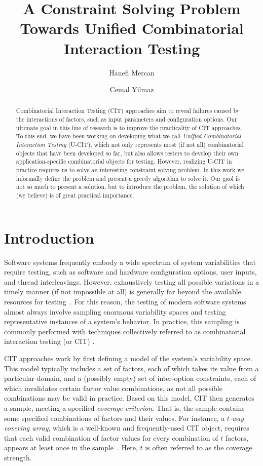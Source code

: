 \documentclass[EPiCempty]{easychair}
\title{A Constraint Solving Problem Towards Unified Combinatorial Interaction Testing}
\author{ Hanefi Mercan \and Cemal Yilmaz }
\institute{
  Faculty of Engineering and Natural Sciences,\\
  Sabanci University, Istanbul, Turkey\\
  \email{\{hanefimercan,cyilmaz\}@sabanciuniv.edu}
 }
\begin{document}
\maketitle

\begin{abstract}
Combinatorial Interaction Testing (CIT) approaches aim to reveal failures caused by the interactions of factors, such as input parameters and configuration options. Our ultimate goal in this line of research is to improve the practicality of CIT approaches. To this end, we have been working on developing what we call {\em Unified Combinatorial Interaction Testing} (U-CIT), which not only represents most (if not all) combinatorial objects that have been developed so far, but also allows testers to develop their own application-specific combinatorial objects for testing. However, realizing U-CIT in practice requires us to solve an interesting constraint solving problem. In this work we informally define the problem and present a greedy algorithm to solve it. Our gaol is not so much to present a solution, but to introduce the problem, the solution of which (we believe) is of great practical importance.
\end{abstract}

\section{Introduction}
\label{intro}

Software systems frequently embody a wide spectrum of system variabilities that require testing, such as software and hardware configuration options, user inputs, and thread interleavings. However, exhaustively testing all possible variations in a timely manner (if not impossible at all) is generally far beyond the available resources for testing~\cite{yilmaz2014moving}. For this reason, the testing of modern software systems almost always involve sampling enormous variability spaces and testing representative instances of a system's behavior. In practice, this sampling is commonly performed with techniques collectively referred to as combinatorial interaction testing (or CIT) \cite{yilmaz2014moving,nie2011survey}. 

CIT approaches work by first defining a model of the system's
variability space. This model typically includes a set of factors, each of which takes its value from a particular domain, and a (possibly empty) set of inter-option constraints, each of which invalidates certain factor value combinations, as not all possible combinations may be valid in practice. Based on this model, CIT then generates a sample, meeting a specified \emph{coverage criterion}. That is, the sample contains some specified combinations of factors and their values. For instance, a {\em $t$-way covering array}, which is a well-known and frequently-used CIT object, requires that each valid combination of factor values for every combination of $t$ factors, appears at least once in the sample~\cite{cohen1997aetg}. Here, $t$ is often referred to as the coverage strength. 
\end{document}

